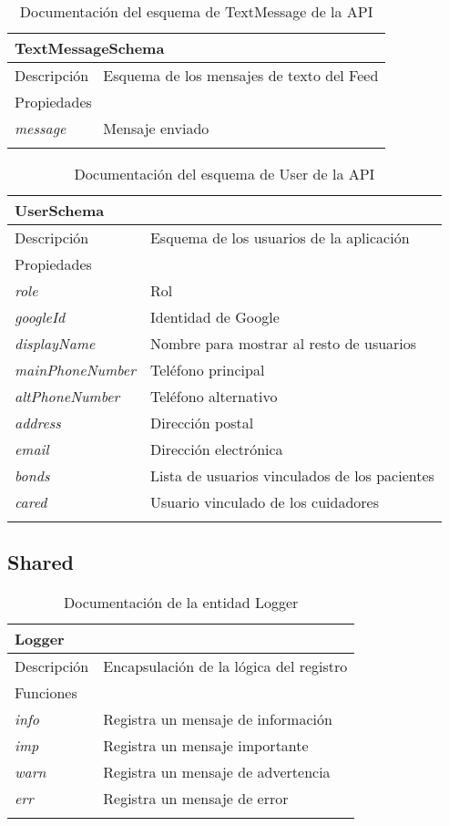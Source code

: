 \begin{longtable}{|p{} p{}|}
    \hline
    \multicolumn{2}{|l|}{\textbf{TextMessageSchema}} \\ \hline \hline
    Descripción      & Esquema de los mensajes de texto del Feed \\ \hline
    \multicolumn{2}{|l|}{Propiedades} \\
    \emph{message}  & Mensaje enviado  \\ \hline
    \caption{Documentación del esquema de TextMessage de la API}
    \label{dis:api:text_message}
\end{longtable}

\begin{longtable}{|p{} p{}|}
    \hline
    \multicolumn{2}{|l|}{\textbf{UserSchema}} \\ \hline \hline
    Descripción      & Esquema de los usuarios de la aplicación \\ \hline
    \multicolumn{2}{|l|}{Propiedades} \\
    \emph{role}  & Rol  \\
    \emph{googleId}  & Identidad de Google  \\
    \emph{displayName}  & Nombre para mostrar al resto de usuarios  \\
    \emph{mainPhoneNumber}  & Teléfono principal  \\
    \emph{altPhoneNumber}  & Teléfono alternativo  \\
    \emph{address}  & Dirección postal  \\
    \emph{email}  & Dirección electrónica  \\
    \emph{bonds}  & Lista de usuarios vinculados de los pacientes  \\
    \emph{cared}  & Usuario vinculado de los cuidadores  \\ \hline
    \caption{Documentación del esquema de User de la API}
    \label{dis:api:user}
\end{longtable}

\subsection{Shared}

\begin{longtable}{|p{} p{}|}
    \hline
    \multicolumn{2}{|l|}{\textbf{Logger}} \\ \hline \hline
    Descripción      & Encapsulación de la lógica del registro  \\ \hline
    \multicolumn{2}{|l|}{Funciones} \\
    \emph{info}  & Registra un mensaje de información  \\
    \emph{imp}  & Registra un mensaje importante  \\
    \emph{warn}  & Registra un mensaje de advertencia  \\
    \emph{err}  & Registra un mensaje de error  \\  \hline
    \caption{Documentación de la entidad Logger}
    \label{dis:api:logger}
\end{longtable}

